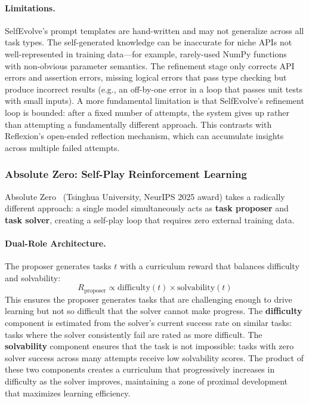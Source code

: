 \paragraph{Limitations.}
SelfEvolve's prompt templates are hand-written and may not generalize across all task types. The self-generated knowledge can be inaccurate for niche APIs not well-represented in training data---for example, rarely-used NumPy functions with non-obvious parameter semantics. The refinement stage only corrects API errors and assertion errors, missing logical errors that pass type checking but produce incorrect results (e.g., an off-by-one error in a loop that passes unit tests with small inputs). A more fundamental limitation is that SelfEvolve's refinement loop is bounded: after a fixed number of attempts, the system gives up rather than attempting a fundamentally different approach. This contrasts with Reflexion's open-ended reflection mechanism, which can accumulate insights across multiple failed attempts.


\subsubsection{Absolute Zero: Self-Play Reinforcement Learning}

Absolute Zero~\citep{absolutezero2025} (Tsinghua University, NeurIPS 2025 award) takes a radically different approach: a single model simultaneously acts as \textbf{task proposer} and \textbf{task solver}, creating a self-play loop that requires zero external training data.

\paragraph{Dual-Role Architecture.}
The proposer generates tasks $t$ with a curriculum reward that balances difficulty and solvability:
\begin{equation}
R_{\text{proposer}} \propto \text{difficulty}(t) \times \text{solvability}(t)
\end{equation}
This ensures the proposer generates tasks that are challenging enough to drive learning but not so difficult that the solver cannot make progress. The \textbf{difficulty} component is estimated from the solver's current success rate on similar tasks: tasks where the solver consistently fail are rated as more difficult. The \textbf{solvability} component ensures that the task is not impossible: tasks with zero solver success across many attempts receive low solvability scores. The product of these two components creates a curriculum that progressively increases in difficulty as the solver improves, maintaining a zone of proximal development that maximizes learning efficiency.

